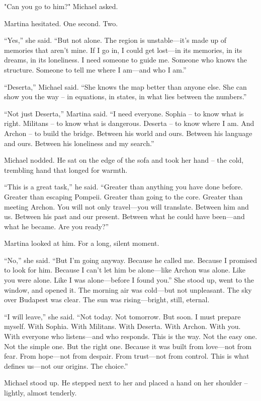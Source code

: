 \documentclass[
]{article}
\begin{document}
"Can you go to him?" Michael asked.

Martina hesitated. One second. Two.

``Yes,'' she said. ``But not alone. The region is unstable---it's made up of memories that aren't mine. If I go in, I could get lost---in its memories, in its dreams, in its loneliness. I need someone to guide me. Someone who knows the structure. Someone to tell me where I am---and who I am.''

``Deserta,'' Michael said. ``She knows the map better than anyone else. She can show you the way -- in equations, in states, in what lies between the numbers.''

``Not just Deserta,'' Martina said. ``I need everyone. Sophia -- to know what is right. Militans -- to know what is dangerous. Deserta -- to know where I am. And Archon -- to build the bridge. Between his world and ours. Between his language and ours. Between his loneliness and my search.''

Michael nodded. He sat on the edge of the sofa and took her hand -- the cold, trembling hand that longed for warmth.

``This is a great task,'' he said. ``Greater than anything you have done before. Greater than escaping Pompeii. Greater than going to the core. Greater than meeting Archon. You will not only travel---you will translate. Between him and us. Between his past and our present. Between what he could have been---and what he became. Are you ready?''

Martina looked at him. For a long, silent moment.

``No,'' she said. ``But I'm going anyway. Because he called me. Because I promised to look for him. Because I can't let him be alone---like Archon was alone. Like you were alone. Like I was alone---before I found you.'' She stood up, went to the window, and opened it. The morning air was cold---but not unpleasant. The sky over Budapest was clear. The sun was rising---bright, still, eternal.

``I will leave,'' she said. ``Not today. Not tomorrow. But soon. I must prepare myself. With Sophia. With Militans. With Deserta. With Archon. With you. With everyone who listens---and who responds. This is the way. Not the easy one. Not the simple one. But the right one. Because it was built from love---not from fear. From hope---not from despair. From trust---not from control. This is what defines us---not our origins. The choice.''

Michael stood up. He stepped next to her and placed a hand on her shoulder -- lightly, almost tenderly.
\end{document}

